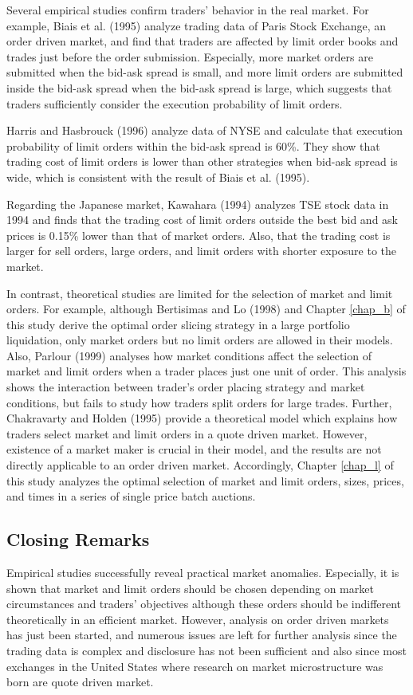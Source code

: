 Several empirical studies confirm traders' behavior in the real market.  For example, 
Biais et al. (1995) analyze trading data of Paris Stock Exchange, an order driven market, and find that traders are affected by limit order books and trades just before the order submission.  Especially, more market orders are submitted when the bid-ask spread is small, and more limit orders are submitted inside the bid-ask spread when the bid-ask spread is large, which suggests that traders sufficiently consider the execution probability of limit orders.

Harris and Hasbrouck (1996) analyze data of NYSE and calculate that execution probability of limit orders within the bid-ask spread is 60\%.  They show that trading cost of limit orders is lower than other strategies when bid-ask spread is wide, which is consistent with the result of Biais et al. (1995).

Regarding the Japanese market, Kawahara (1994) analyzes TSE stock data in 1994 and finds that the trading cost of limit orders outside the best bid and ask prices is 0.15\% lower than that of market orders.  Also, that the trading cost is larger for sell orders, large orders, and limit orders with shorter exposure to the market.

In contrast, theoretical studies are limited for the selection of market and limit orders.  For example, although Bertisimas and Lo (1998) and Chapter \ref{chap_b} of this study derive the optimal order slicing strategy in a large portfolio liquidation, only market orders but no limit orders are allowed in their models.  Also, Parlour (1999) analyses how market conditions affect the selection of market and limit orders when a trader places just one unit of order.  This analysis shows the interaction between trader's order placing strategy and market conditions, but fails to study how traders split orders for large trades.  Further, Chakravarty and Holden (1995) provide a theoretical model which explains how traders select market and limit orders in a quote driven market.  However, existence of a market maker is crucial in their model, and the results are not directly applicable to an order driven market.  Accordingly, Chapter \ref{chap_l} of this study analyzes the optimal selection of market and limit orders, sizes, prices, and times in a series of single price batch auctions.  

\subsection{Closing Remarks}\label{subsec_r24}
Empirical studies successfully reveal practical market anomalies.  Especially, it is shown that market and limit orders should be chosen depending on market circumstances and traders' objectives although these orders should be indifferent theoretically in an efficient market.  However, analysis on order driven markets has just been started, and numerous issues are left for further analysis since the trading data is complex and disclosure has not been sufficient and also since most exchanges in the United States where research on market microstructure was born are quote driven market.

